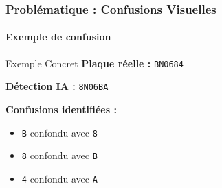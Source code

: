 \documentclass[
	11pt,
	aspectratio=169,
]{beamer}
\begin{document}

\begin{frame}
	\frametitle{Problématique : Confusions Visuelles}
	\framesubtitle{Exemple de confusion}

	\begin{exampleblock}{Exemple Concret}
		\textbf{Plaque réelle :} \texttt{BN0684}
		
		\textbf{Détection IA :} \texttt{8N06BA}
		
		\smallskip
		
		\textbf{Confusions identifiées :}
		\begin{itemize}
			\item \texttt{B} confondu avec \texttt{8}
			\item \texttt{8} confondu avec \texttt{B}
			\item \texttt{4} confondu avec \texttt{A}
		\end{itemize}
	\end{exampleblock}
	
\end{frame}

\end{document}
